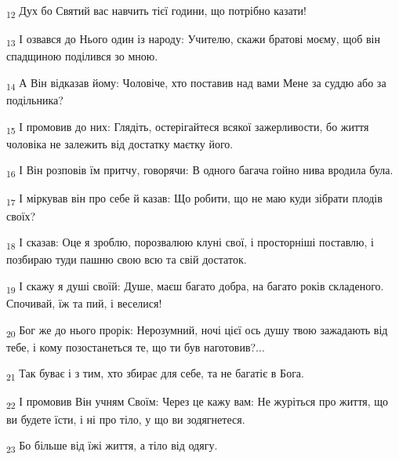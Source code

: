 \begin{tcolorbox}
\textsubscript{12} Дух бо Святий вас навчить тієї години, що потрібно казати!
\end{tcolorbox}
\begin{tcolorbox}
\textsubscript{13} І озвався до Нього один із народу: Учителю, скажи братові моєму, щоб він спадщиною поділився зо мною.
\end{tcolorbox}
\begin{tcolorbox}
\textsubscript{14} А Він відказав йому: Чоловіче, хто поставив над вами Мене за суддю або за подільника?
\end{tcolorbox}
\begin{tcolorbox}
\textsubscript{15} І промовив до них: Глядіть, остерігайтеся всякої зажерливости, бо життя чоловіка не залежить від достатку маєтку його.
\end{tcolorbox}
\begin{tcolorbox}
\textsubscript{16} І Він розповів їм притчу, говорячи: В одного багача гойно нива вродила була.
\end{tcolorbox}
\begin{tcolorbox}
\textsubscript{17} І міркував він про себе й казав: Що робити, що не маю куди зібрати плодів своїх?
\end{tcolorbox}
\begin{tcolorbox}
\textsubscript{18} І сказав: Оце я зроблю, порозвалюю клуні свої, і просторніші поставлю, і позбираю туди пашню свою всю та свій достаток.
\end{tcolorbox}
\begin{tcolorbox}
\textsubscript{19} І скажу я душі своїй: Душе, маєш багато добра, на багато років складеного. Спочивай, їж та пий, і веселися!
\end{tcolorbox}
\begin{tcolorbox}
\textsubscript{20} Бог же до нього прорік: Нерозумний, ночі цієї ось душу твою зажадають від тебе, і кому позостанеться те, що ти був наготовив?...
\end{tcolorbox}
\begin{tcolorbox}
\textsubscript{21} Так буває і з тим, хто збирає для себе, та не багатіє в Бога.
\end{tcolorbox}
\begin{tcolorbox}
\textsubscript{22} І промовив Він учням Своїм: Через це кажу вам: Не журіться про життя, що ви будете їсти, і ні про тіло, у що ви зодягнетеся.
\end{tcolorbox}
\begin{tcolorbox}
\textsubscript{23} Бо більше від їжі життя, а тіло від одягу.
\end{tcolorbox}
